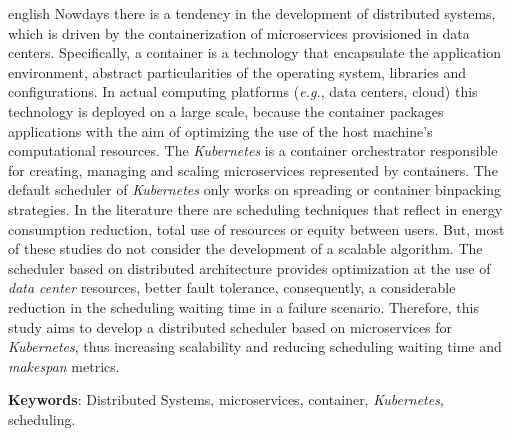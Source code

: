 \documentclass[
	12pt,				%
	openright,			%
	oneside,			%
	a4paper,			%
	brazil				%
	]{abntex2}
\newcommand{\listofquadrosname}{Lista de quadros}
\begin{document}
\begin{resumo}[Abstract]
 \begin{otherlanguage*}{english}
   Nowdays there is a tendency in the development of distributed systems, which is driven by the containerization of microservices provisioned in data centers. Specifically, a container is a technology that encapsulate the application environment, abstract particularities of the operating system, libraries and configurations. In actual computing platforms (\textit{e.g.}, data centers, cloud) this technology is deployed on a large scale, because the container packages applications with the aim of optimizing the use of the host machine's computational resources. The \textit{Kubernetes} is a container orchestrator responsible for creating, managing and scaling microservices represented by containers. The default scheduler of \textit{Kubernetes} only works on spreading or container binpacking strategies. In the literature there are scheduling techniques that reflect in energy consumption reduction, total use of resources or equity between users. But, most of these studies do not consider the development of a scalable algorithm. The scheduler based on distributed architecture provides optimization at the use of \textit{data center} resources, better fault tolerance, consequently, a considerable reduction in the scheduling waiting time in a failure scenario. Therefore, this study aims to develop a distributed scheduler based on microservices for \textit{Kubernetes}, thus increasing scalability and reducing scheduling waiting time and \textit{makespan} metrics.
   \vspace{\onelineskip}

   \noindent 
   \textbf{Keywords}: Distributed Systems, microservices, container, \textit{Kubernetes}, scheduling.
 \end{otherlanguage*}
\end{resumo}

\listoffigures*
\cleardoublepage


\end{document}
